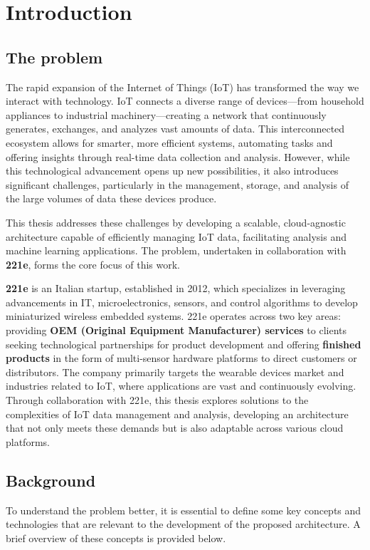 \chapter{Introduction}
\label{cap:introduction}

\section{The problem}
\label{sec:the-problem}
The rapid expansion of the Internet of Things (IoT) has transformed the way we interact with technology. IoT connects a diverse range of devices—from household appliances to industrial machinery—creating a network that continuously generates, exchanges, and analyzes vast amounts of data. This interconnected ecosystem allows for smarter, more efficient systems, automating tasks and offering insights through real-time data collection and analysis. However, while this technological advancement opens up new possibilities, it also introduces significant challenges, particularly in the management, storage, and analysis of the large volumes of data these devices produce.

This thesis addresses these challenges by developing a scalable, cloud-agnostic architecture capable of efficiently managing IoT data, facilitating analysis and machine learning applications. The problem, undertaken in collaboration with \textbf{221e}, forms the core focus of this work.

\textbf{221e} is an Italian startup, established in 2012, which specializes in leveraging advancements in IT, microelectronics, sensors, and control algorithms to develop miniaturized wireless embedded systems. 221e operates across two key areas: providing \textbf{OEM (Original Equipment Manufacturer) services} to clients seeking technological partnerships for product development and offering \textbf{finished products} in the form of multi-sensor hardware platforms to direct customers or distributors. The company primarily targets the wearable devices market and industries related to IoT, where applications are vast and continuously evolving.
Through collaboration with 221e, this thesis explores solutions to the complexities of IoT data management and analysis, developing an architecture that not only meets these demands but is also adaptable across various cloud platforms.


\section{Background}
\label{sec:background}
To understand the problem better, it is essential to define some key concepts and technologies that are relevant to the development of the proposed architecture. A brief overview of these concepts is provided below.

